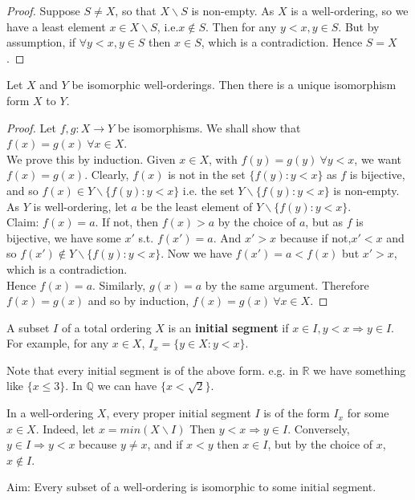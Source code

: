 \begin{proof} Suppose $S \neq X$, so that $X \backslash S$ is non-empty.
As $X$ is a well-ordering, so we have a least element $x \in X \backslash S$,
i.e.$x \not \in S$. Then for any $y<x, y \in S$. But by assumption,
if $\forall y<x, y \in S$ then $x \in S$, which is a contradiction.
Hence $S=X$.
\end{proof}
\begin{proposition} Let $X$ and $Y$ be isomorphic well-orderings.
Then there is a unique isomorphism form $X$ to $Y$.
\end{proposition}
\begin{proof} Let $f,g :X \rightarrow Y$ be isomorphisms.
We shall show that $f(x)=g(x)~\forall x \in X$.\\
We prove this by induction. Given $x \in X$, with $f(y)=g(y)~\forall y<x$,
we want $f(x)=g(x)$.  Clearly, $f(x)$ is not in the set $\{f(y): y<x\}$ as $f$
is bijective, and so $f(x) \in Y \backslash \{f(y): y<x\}$ i.e.
the set $Y \backslash \{f(y): y<x\}$ is non-empty. As $Y$ is well-ordering,
let $a$ be the least element of $Y \backslash \{f(y): y<x\}$.\\
Claim: $f(x)=a$. If not, then $f(x)>a$ by the choice of $a$,
but as $f$ is bijective, we have some $x'$ s.t. $f(x')=a$.
And $x'>x$ because if not,$x'<x$ and so $f(x') \not \in Y \backslash \{f(y): y<x\}$.
Now we have $f(x')=a<f(x)$ but $x'>x$, which is a contradiction.\\
Hence $f(x)=a$. Similarly, $g(x)=a$ by the same argument.
Therefore $f(x)=g(x)$ and so by induction, $f(x)=g(x)~\forall x \in X$.
\end{proof}
\begin{definition} A subset $I$ of a total ordering $X$ is an
{\bf initial segment} if $x \in I, y<x \Rightarrow y \in I$.
For example, for any $x \in X$, $I_x=\{y \in X: y<x\}$.
\end{definition}
Note that every initial segment is of the above form. e.g.
in $\mathbb{R}$ we have something like $\{x \le 3\}$.
In $\mathbb{Q}$ we can have $\{x<\sqrt{2}\}$.
\begin{remark} In a well-ordering $X$, every proper initial segment
$I$ is of the form $I_x$ for some $x \in X$. Indeed,
let $x=min(X \backslash I)$ Then $y<x \Rightarrow y \in I$.
Conversely, $y \in I \Rightarrow y<x$ because $y \neq x$,
and if $x<y$ then $x \in I$, but by the choice of $x$, $x \not \in I$.
\end{remark}
Aim: Every subset of a well-ordering is isomorphic to some initial segment.\\
